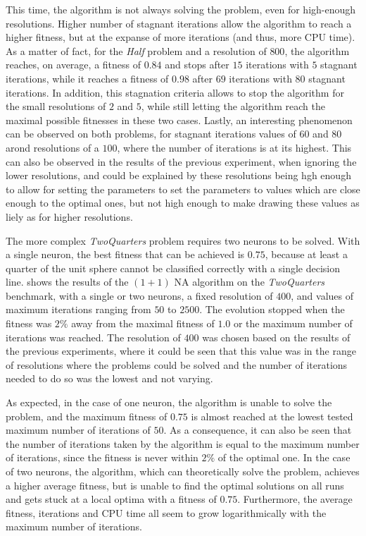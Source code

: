 This time, the algorithm is not always solving the problem, even for high-enough resolutions. Higher number of stagnant iterations allow the algorithm to reach a higher fitness, but at the
expanse of more iterations (and thus, more CPU time). As a matter of fact, for the \textit{Half} problem and a resolution of $800$, the algorithm reaches, on average, a fitness of
$0.84$ and stops after $15$ iterations with $5$ stagnant iterations, while it reaches a fitness of $0.98$ after $69$ iterations with $80$ stagnant iterations.
In addition, this stagnation criteria allows to stop the algorithm for the small resolutions of $2$ and $5$, while still letting the algorithm reach the maximal possible fitnesses in these
two cases. Lastly, an interesting phenomenon can be observed on both problems, for stagnant iterations values of $60$ and $80$ arond resolutions of a $100$, where the number of iterations
is at its highest. This can also be observed in the results of the previous experiment, when ignoring the lower resolutions, and could be explained by these resolutions being hgh enough
to allow for setting the parameters to set the parameters to values which are close enough to the optimal ones, but not high enough to make drawing these values as liely as for higher resolutions.

The more complex \textit{TwoQuarters} problem requires two neurons to be solved. With a single neuron, the best fitness that can be achieved is $0.75$, because at least a quarter of the unit sphere
cannot be classified correctly with a single decision line.  shows the results of the $(1 + 1)$ NA algorithm on the \textit{TwoQuarters} benchmark, with a single or two neurons,
a fixed resolution of $400$, and values of maximum iterations ranging from $50$ to $2500$. The evolution stopped when the fitness was $2\%$ away from the maximal fitness of $1.0$ or
the maximum number of iterations was reached. The resolution of $400$ was chosen based on the results of the previous experiments, where it could be seen that this value was in the range of
resolutions where the problems could be solved and the number of iterations needed to do so was the lowest and not varying.

As expected, in the case of one neuron, the algorithm is unable to solve the problem, and the maximum fitness of $0.75$ is almost reached at the lowest tested maximum number of iterations of $50$.
As a consequence, it can also be seen that the number of iterations taken by the algorithm is equal to the maximum number of iterations, since the fitness is never within $2\%$ of the optimal one.
In the case of two neurons, the algorithm, which can theoretically solve the problem, achieves a higher average fitness, but is unable to find the optimal solutions on all runs and gets stuck
at a local optima with a fitness of $0.75$. %
Furthermore, the average fitness, iterations and CPU time all seem to grow logarithmically with the maximum number of iterations.

